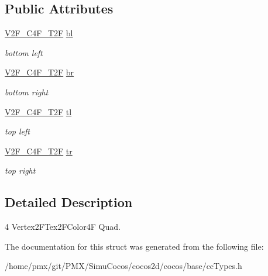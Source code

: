 \subsection*{Public Attributes}
\begin{DoxyCompactItemize}
\item 
\mbox{\label{structV2F__C4F__T2F__Quad_a41750a615906d3c6add608a646f81378}} 
\hyperlink{structV2F__C4F__T2F}{V2\+F\+\_\+\+C4\+F\+\_\+\+T2F} \hyperlink{structV2F__C4F__T2F__Quad_a41750a615906d3c6add608a646f81378}{bl}
\begin{DoxyCompactList}\small\item\em bottom left \end{DoxyCompactList}\item 
\mbox{\label{structV2F__C4F__T2F__Quad_a22b97fb8ca203ab11a83acc76b49912c}} 
\hyperlink{structV2F__C4F__T2F}{V2\+F\+\_\+\+C4\+F\+\_\+\+T2F} \hyperlink{structV2F__C4F__T2F__Quad_a22b97fb8ca203ab11a83acc76b49912c}{br}
\begin{DoxyCompactList}\small\item\em bottom right \end{DoxyCompactList}\item 
\mbox{\label{structV2F__C4F__T2F__Quad_acba9ed1829b8222d3a0cc2293cb0e267}} 
\hyperlink{structV2F__C4F__T2F}{V2\+F\+\_\+\+C4\+F\+\_\+\+T2F} \hyperlink{structV2F__C4F__T2F__Quad_acba9ed1829b8222d3a0cc2293cb0e267}{tl}
\begin{DoxyCompactList}\small\item\em top left \end{DoxyCompactList}\item 
\mbox{\label{structV2F__C4F__T2F__Quad_a01afabd738f39ba38e33e9c82a9ef481}} 
\hyperlink{structV2F__C4F__T2F}{V2\+F\+\_\+\+C4\+F\+\_\+\+T2F} \hyperlink{structV2F__C4F__T2F__Quad_a01afabd738f39ba38e33e9c82a9ef481}{tr}
\begin{DoxyCompactList}\small\item\em top right \end{DoxyCompactList}\end{DoxyCompactItemize}


\subsection{Detailed Description}
4 Vertex2\+F\+Tex2\+F\+Color4F Quad. 

The documentation for this struct was generated from the following file\+:\begin{DoxyCompactItemize}
\item 
/home/pmx/git/\+P\+M\+X/\+Simu\+Cocos/cocos2d/cocos/base/cc\+Types.\+h\end{DoxyCompactItemize}
